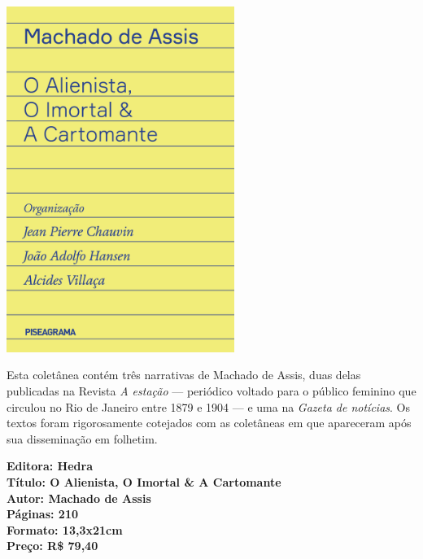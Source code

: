 \pagestyle{hedra}
\label{hedra}



\begin{center}
\hspace*{-3.6cm}
\hspace*{3.1cm}\includegraphics[width=74mm]{./grid/alienista.png}
\end{center}

\hspace*{-7cm}\hrulefill\hspace*{-7cm}

\medskip

\noindent{}Esta coletânea contém três narrativas de Machado de Assis, duas delas publicadas na Revista \textit{A estação} — periódico voltado para o público feminino que circulou no Rio de Janeiro entre 1879 e 1904 — e uma na \textit{Gazeta de notícias}. Os textos foram rigorosamente cotejados com as coletâneas em que apareceram após sua disseminação em folhetim.

\vfill

\noindent\begin{minipage}[c]{1\linewidth}
{\small\textbf{
\hspace*{-.1cm}Editora: Hedra\\
Título: O Alienista, O Imortal & A Cartomante\\
Autor: Machado de Assis\\ 
Páginas: 210\\
Formato: 13,3x21cm\\
Preço: R\$ 79,40\\
}}
\end{minipage}

